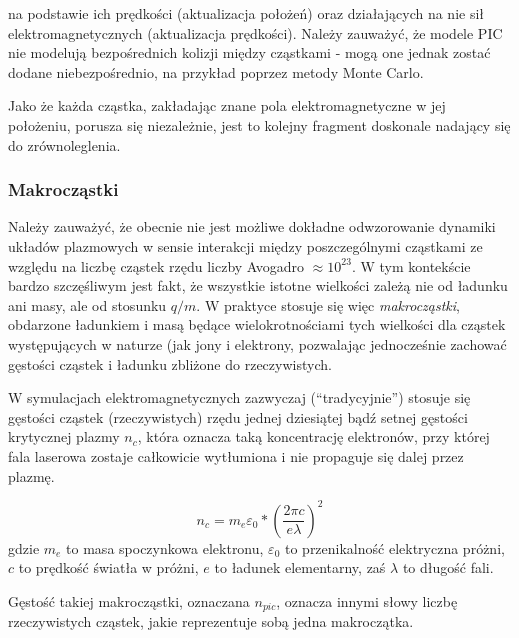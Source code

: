 \begin{itemize}
    na podstawie ich prędkości (aktualizacja położeń)
    oraz działających na nie sił elektromagnetycznych (aktualizacja prędkości). Należy zauważyć, że modele PIC
    nie modelują bezpośrednich kolizji między cząstkami - mogą one jednak zostać dodane niebezpośrednio, na przykład
    poprzez metody Monte Carlo. 

    Jako że każda cząstka, zakładając znane pola elektromagnetyczne w jej położeniu, porusza się niezależnie,
    jest to kolejny fragment doskonale nadający się do zrównoleglenia.
    \end{itemize}
    \subsubsection{Makrocząstki}
    Należy zauważyć, że obecnie nie jest możliwe dokładne odwzorowanie dynamiki układów plazmowych w sensie interakcji
    między poszczególnymi cząstkami ze względu na liczbę cząstek rzędu liczby Avogadro $\approx 10^{23}$.
    W tym kontekście bardzo szczęśliwym jest fakt, że wszystkie istotne wielkości zależą nie od ładunku ani masy,
    ale od stosunku $q/m$. W praktyce stosuje się więc \emph{makrocząstki}, obdarzone ładunkiem i masą będące wielokrotnościami
    tych wielkości dla cząstek występujących w naturze (jak jony i elektrony, pozwalając jednocześnie zachować gęstości
    cząstek i ładunku 
    zbliżone do rzeczywistych.

    W symulacjach elektromagnetycznych zazwyczaj (``tradycyjnie'') stosuje się gęstości cząstek (rzeczywistych)
    rzędu jednej dziesiątej bądź setnej gęstości
    krytycznej plazmy $n_c$, która oznacza taką koncentrację elektronów, przy której 
    fala laserowa zostaje całkowicie wytłumiona i nie propaguje się dalej przez plazmę.

    \begin{equation}
        n_c = m_e \varepsilon_0 * (\frac{2 \pi c}{e \lambda})^2
        \label{eqn:critical-density}
    \end{equation}
    gdzie $m_e$ to masa spoczynkowa elektronu, $\varepsilon_0$ to przenikalność elektryczna próżni, 
    $c$ to prędkość światła w próżni, $e$ to ładunek elementarny, zaś $\lambda$ to długość fali.

    Gęstość takiej makrocząstki, oznaczana $n_{pic}$, oznacza innymi słowy liczbę rzeczywistych cząstek, jakie reprezentuje
    sobą jedna makroczątka. 

